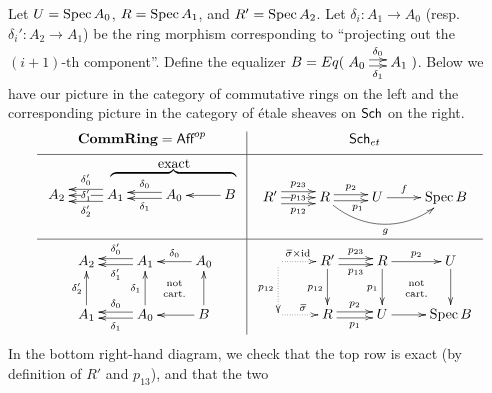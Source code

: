  Let $U=\operatorname{Spec} A_0$, $R=\operatorname{Spec}
 A_1$, and $R'=\operatorname{Spec} A_2$. Let $\delta_i:A_1\to A_0$ (resp.~$\delta_i':A_2\to A_1$) be
 the ring morphism corresponding to ``projecting out the $(i+1)\text{-th}$ component''.
 Define the equalizer
 $B=Eq(\xymatrix@-1pc{A_0\ar@<.5ex>[r]^{\delta_0}\ar@<-.5ex>[r]_{\delta_1} & A_1})$.
 Below we have our picture in the category of commutative rings on the left and the
 corresponding picture in the category of \'etale sheaves on $\text{\sf Sch}$ on the right.
 \[\begin{array}{c|c}
    \textbf{CommRing}=\aff^{op} & \sch_{et}\\[1ex] \hline
    \xymatrix@R-2.5pc{
     & & \makebox[0pt]{exact\rule[-2pt]{0pt}{0pt}}\\
    A_2 & A_1
    \ar@<-1ex>[l]_<>(.5){\delta_0'}\ar[l]|<>(.5){\delta_1'}\ar@<1ex>[l]^<>(.5){\delta_2'}
    & A_0 \ar@<-.5ex>[l]_{\delta_0} \ar@<.5ex>[l]^{\delta_1}
    \hspace{-1.5ex}\makebox[0pt]{$\overbrace{\hspace{7.5pc}\rule[-1.25pc]{0pt}{2.5pc}}$}
    \hspace{1.5ex} & B \ar[l]}
    &
    \raisebox{-2pc}{$\xymatrix@R-1pc{
    R'
    \ar@<1ex>[r]^<>(.5){p_{23}} \ar[r]|<>(.5){p_{13}} \ar@<-1ex>[r]_<>(.5){p_{12}}
    & R
      \ar@<.5ex>[r]^<>(.5){p_2} \ar@<-.5ex>[r]_<>(.7){p_1} \ar@(dr,dl)[rr]_g
    & U \ar[r]^<>(.5)f & \spec B}$}\\ \hline
    \xymatrix{
    A_2 & A_1 \ar@<.5ex>[l]^{\delta_1'}\ar@<-.5ex>[l]_{\delta_0'}
    \ar@{}[dr]|{\mbox{\scriptsize\txt{not\\ cart.}}} & A_0\ar[l]_{\delta_0}\\
    A_1 \ar[u]^{\delta_2'} & A_0 \ar[u]^{\delta_1}
    \ar@<.5ex>[l]^{\delta_1}\ar@<-.5ex>[l]_{\delta_0} & B \ar[l] \ar[u]}
   &
   \xymatrix{
    \ar@{.>}[d]_{p_{12}}\ar@{.>}[r]^(.4){\bbar\sigma \times \id}& R'\ar[d]_{p_{12}}
    \ar@<.5ex>[r]^<>(.5){p_{23}} \ar@<-.5ex>[r]_<>(.5){p_{13}}
    & R \ar[r]^<>(.5){p_2} \ar[d]_{p_1}\ar@{}[dr]|{\mbox{\scriptsize\txt{not\\ cart.}}} & U \ar[d]\\
    \ar@{.>}[r]^{\bbar\sigma}& R \ar@<.5ex>[r]^<>(.5){p_2} \ar@<-.5ex>[r]_<>(.5){p_1} & U \ar[r] & \spec B}
 \end{array}\]
  In the bottom right-hand diagram, we check that the top row is exact (by definition of
 $R'$ and $p_{13}$), and that the two
